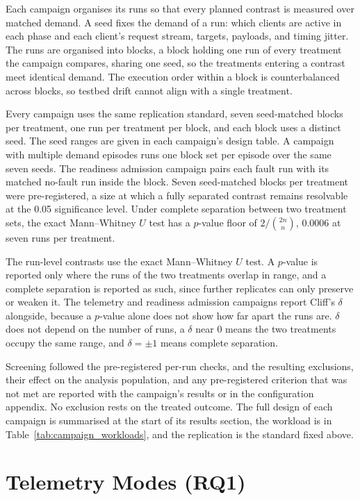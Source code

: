 ﻿\documentclass[12pt,reqno,twoside]{amsbook}
\begin{document}
Each campaign organises its runs so that every planned contrast is
measured over matched demand. A seed fixes the demand of a run: which clients
are active in each phase and each client's request stream, targets, payloads,
and timing jitter. The runs are organised into blocks, a block holding one run
of every treatment the campaign compares, sharing one seed, so the treatments
entering a contrast meet identical demand. The execution order within a block
is counterbalanced across blocks, so testbed drift cannot align with a single
treatment.

Every campaign uses the same replication standard, seven
seed-matched blocks per treatment, one run per treatment per block, and each
block uses a distinct seed. The seed ranges are given in each campaign's design
table. A campaign with multiple demand episodes runs one block set per episode
over the same seven seeds. The readiness admission campaign pairs each fault run
with its matched no-fault run inside the block. Seven seed-matched blocks per
treatment were pre-registered, a size at which a fully separated contrast
remains resolvable at the 0.05 significance level. Under complete
separation between two treatment sets, the exact Mann--Whitney $U$ test has a
$p$-value floor of $2/\binom{2n}{n}$, 0.0006 at seven runs per treatment.

The run-level contrasts use the exact Mann--Whitney $U$ test. A $p$-value is
reported only where the runs of the two treatments overlap in range, and a
complete separation is reported as such, since further replicates can only
preserve or weaken it. The telemetry and readiness admission campaigns report
Cliff's $\delta$ alongside, because a $p$-value alone does not show how far
apart the runs are. $\delta$ does not depend on the number of runs, a $\delta$
near $0$ means the two treatments occupy the same range, and $\delta=\pm1$
means complete separation.

Screening followed the pre-registered per-run checks, and the resulting
exclusions, their effect on the analysis population, and any pre-registered
criterion that was not met are reported with the campaign's results or in the
configuration appendix. No exclusion rests on the treated outcome. The full design of each
campaign is summarised at the start of its results section, the workload is in
Table~\ref{tab:campaign_workloads}, and the replication is the standard fixed
above.


\section{Telemetry Modes (RQ1)}\label{sec:results_rq1_delivery}
\end{document}
